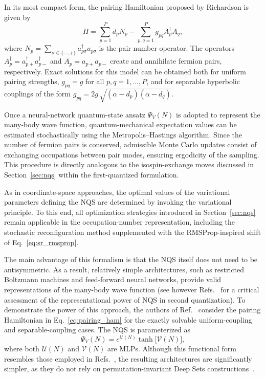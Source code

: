 In its most compact form, the pairing Hamiltonian proposed by Richardson is given by
\begin{equation}\label{eq:pairing_ham}
H = \sum_{p=1}^P d_p N_p - \sum_{p, q = 1}^P g_{pq} A_p^\dagger A_q,
\end{equation}
where $N_p = \sum_{\sigma \in \{\minus, \plus\}} a_{p \sigma}^\dagger a_{p \sigma}$ is the pair number operator.
The operators $A_p^\dagger = a_{p\plus}^\dagger a_{p\minus}^\dagger$ and $A_p = a_{p\plus} a_{p\minus}$ create and annihilate fermion pairs, respectively.
Exact solutions for this model can be obtained both for uniform pairing strengths, $g_{pq} = g$ for all $p,q = 1,\ldots,P$, and for separable hyperbolic couplings of the form
$g_{pq} = 2g\,\sqrt{(\alpha - d_p)(\alpha - d_q)}$.

Once a neural-network quantum-state ansatz $\Psi_V(N)$ is adopted to represent the many-body wave function, quantum-mechanical expectation values can be estimated stochastically using the Metropolis--Hastings algorithm.
Since the number of fermion pairs is conserved, admissible Monte Carlo updates consist of exchanging occupations between pair modes, ensuring ergodicity of the sampling.
This procedure is directly analogous to the isospin-exchange moves discussed in Section~\ref{sec:nqs} within the first-quantized formulation.

As in coordinate-space approaches, the optimal values of the variational parameters defining the NQS are determined by invoking the variational principle.
To this end, all optimization strategies introduced in Section~\ref{sec:nqs} remain applicable in the occupation-number representation, including the stochastic reconfiguration method supplemented with the RMSProp-inspired shift of Eq.~\eqref{eq:sr_rmsprop}.

The main advantage of this formalism is that the NQS itself does not need to be antisymmetric.
As a result, relatively simple architectures, such as restricted Boltzmann machines and feed-forward neural networks, provide valid representations of the many-body wave function (see however Refs.~\cite{passetti_can_2023,denis_comment_2025} for a critical assessment of the representational power of NQS in second quantization).
To demonstrate the power of this approach, the authors of Ref.~\cite{rigo_solving_2023} consider the pairing Hamiltonian in Eq.~\eqref{eq:pairing_ham} for the exactly solvable uniform-coupling and separable-coupling cases. The NQS is parameterized as
\begin{equation}
    \Psi_V(N) = e^{\mathcal{U}(N)} \tanh \big[ \mathcal{V}(N) \big],
\end{equation}
where both $\mathcal{U}(N)$ and $\mathcal{V}(N)$ are MLPs. Although this functional form resembles those employed in Refs.~\cite{adams_variational_2021,gnech_calculation_2020,yang_consistent_2022}, the resulting architectures are significantly simpler, as they do not rely on permutation-invariant Deep Sets constructions~\cite{fuchs_deepsets_2019}.




